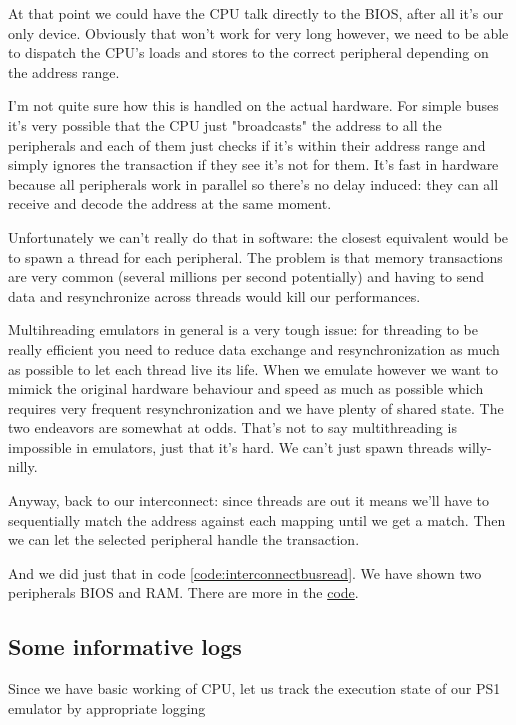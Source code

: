 \documentclass[a4paper]{article}
\begin{document}
At that point we could have the CPU talk directly to the BIOS, after
all it's our only device. Obviously that won't work for very long
however, we need to be able to dispatch the CPU's loads and stores to
the correct peripheral depending on the address range.

I'm not quite sure how this is handled on the actual hardware. For
simple buses it's very possible that the CPU just "broadcasts" the
address to all the peripherals and each of them just checks if it's
within their address range and simply ignores the transaction if they
see it's not for them. It's fast in hardware because all peripherals
work in parallel so there's no delay induced: they can all receive and
decode the address at the same moment.

Unfortunately we can't really do that in software: the closest
equivalent would be to spawn a thread for each peripheral. The problem
is that memory transactions are very common (several millions per
second potentially) and having to send data and resynchronize across
threads would kill our performances.

Multihreading emulators in general is a very tough issue: for
threading to be really efficient you need to reduce data exchange and
resynchronization as much as possible to let each thread live its
life. When we emulate however we want to mimick the original hardware
behaviour and speed as much as possible which requires very frequent
resynchronization and we have plenty of shared state. The two
endeavors are somewhat at odds. That's not to say multithreading is
impossible in emulators, just that it's hard. We can't just spawn
threads willy-nilly.

Anyway, back to our interconnect: since threads are out it means we'll
have to sequentially match the address against each mapping until we
get a match. Then we can let the selected peripheral handle the
transaction.

And we did just that in code \ref{code:interconnectbusread}. We have shown
two peripherals BIOS and RAM.  There are more in the \href{https://github.com/ravimohan1991/PSXemu/blob/6bb673613c2d8eac6d9113fa6fa369346028a8b5/core/memory/bus.cpp#L215-L288}{code}.

\subsection{Some informative logs}

Since we have basic working of CPU, let us track the execution state
of our PS1 emulator by appropriate logging
\end{document}
